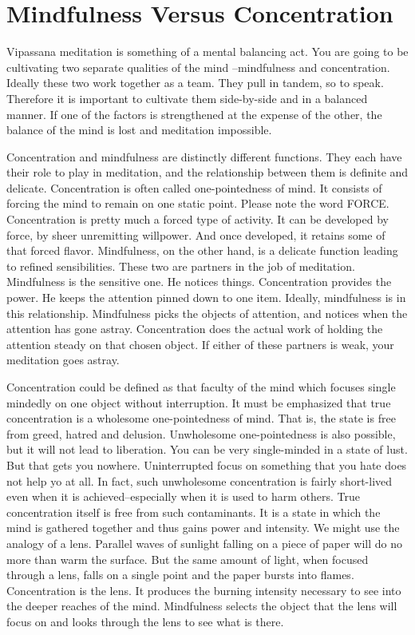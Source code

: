 \chapter{Mindfulness Versus Concentration} 

Vipassana meditation is something of a mental balancing act. You are going to be
cultivating two separate qualities of the mind --mindfulness and concentration.
Ideally these two work together as a team. They pull in tandem, so to speak.
Therefore it is important to cultivate them side-by-side and in a balanced
manner. If one of the factors is strengthened at the expense of the other, the
balance of the mind is lost and meditation impossible.

Concentration and mindfulness are distinctly different functions. They each have
their role to play in meditation, and the relationship between them is definite
and delicate. Concentration is often called one-pointedness of mind. It consists
of forcing the mind to remain on one static point. Please note the word FORCE.
Concentration is pretty much a forced type of activity. It can be developed by
force, by sheer unremitting willpower. And once developed, it retains some of
that forced flavor. Mindfulness, on the other hand, is a delicate function
leading to refined sensibilities. These two are partners in the job of
meditation. Mindfulness is the sensitive one. He notices things. Concentration
provides the power. He keeps the attention pinned down to one item. Ideally,
mindfulness is in this relationship. Mindfulness picks the objects of attention,
and notices when the attention has gone astray.  Concentration does the actual
work of holding the attention steady on that chosen object. If either of these
partners is weak, your meditation goes astray.

Concentration could be defined as that faculty of the mind which focuses single
mindedly on one object without interruption. It must be emphasized that true
concentration is a wholesome one-pointedness of mind. That is, the state is free
from greed, hatred and delusion. Unwholesome one-pointedness is also possible,
but it will not lead to liberation. You can be very single-minded in a state of
lust. But that gets you nowhere. Uninterrupted focus on something that you hate
does not help yo at all. In fact, such unwholesome concentration is fairly
short-lived even when it is achieved--especially when it is used to harm others.
True concentration itself is free from such contaminants. It is a state in which
the mind is gathered together and thus gains power and intensity. We might use
the analogy of a lens. Parallel waves of sunlight falling on a piece of paper
will do no more than warm the surface. But the same amount of light, when
focused through a lens, falls on a single point and the paper bursts into
flames.  Concentration is the lens. It produces the burning intensity necessary
to see into the deeper reaches of the mind. Mindfulness selects the object that
the lens will focus on and looks through the lens to see what is there.

